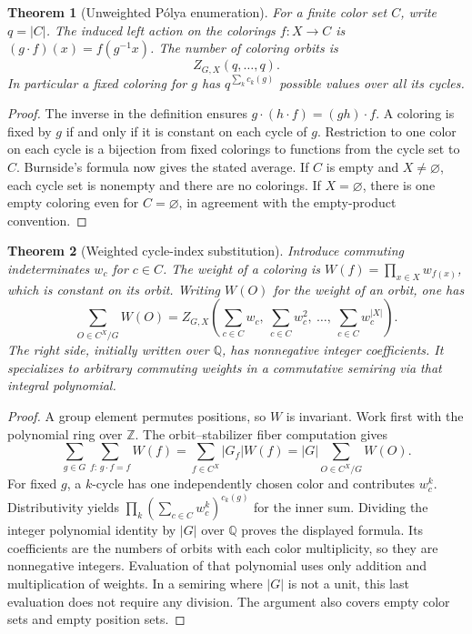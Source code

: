\documentclass[11pt,oneside,openany]{book}
\theoremstyle{plain}
\newtheorem{theorem}{Theorem}[chapter]
\theoremstyle{definition}
\theoremstyle{remark}
\begin{document}
\begin{theorem}[Unweighted Pólya enumeration]\label{p204:W32}
For a finite color set \(C\), write \(q=|C|\).
The induced left action on the colorings \(f:X\to C\) is
\((g\cdot f)(x)=f(g^{-1}x)\). The number of coloring orbits is
\[
 Z_{G,X}(q,\ldots,q).
\]
In particular a fixed coloring for \(g\) has
\(q^{\sum_k c_k(g)}\) possible values over all its cycles.
\end{theorem}
\begin{proof}
The inverse in the definition ensures
\(g\cdot(h\cdot f)=(gh)\cdot f\). A coloring is fixed by \(g\)
if and only if it is constant on each cycle of \(g\).
Restriction to one color on each cycle is a bijection from
fixed colorings to functions from the cycle set to \(C\).
Burnside's formula now gives the stated average. If \(C\) is
empty and \(X\ne\varnothing\), each cycle set is nonempty and
there are no colorings. If \(X=\varnothing\), there is one
empty coloring even for \(C=\varnothing\), in agreement with
the empty-product convention.
\end{proof}

\begin{theorem}[Weighted cycle-index substitution]\label{p204:W33}
Introduce commuting indeterminates \(w_c\) for \(c\in C\).
The weight of a coloring is
\(W(f)=\prod_{x\in X}w_{f(x)}\), which is constant on its orbit.
Writing \(W(O)\) for the weight of an orbit, one has
\[
 \sum_{O\in C^X/G}W(O)
 =Z_{G,X}\left(\sum_{c\in C}w_c,\ \sum_{c\in C}w_c^2,\
                         \ldots,\ \sum_{c\in C}w_c^{|X|}\right).
\]
The right side, initially written over \(\mathbb Q\), has
nonnegative integer coefficients. It specializes to arbitrary
commuting weights in a commutative semiring via that integral
polynomial.
\end{theorem}
\begin{proof}
A group element permutes positions, so \(W\) is invariant.
Work first with the polynomial ring over \(\mathbb Z\).
The orbit--stabilizer fiber computation gives
\[
 \sum_{g\in G}\sum_{f:\,g\cdot f=f} W(f)
  =\sum_{f\in C^X}|G_f| W(f)
  =|G|\sum_{O\in C^X/G} W(O).
\]
For fixed \(g\), a \(k\)-cycle has one independently chosen
color and contributes \(w_c^k\). Distributivity yields
\(\prod_k(\sum_{c\in C}w_c^k)^{c_k(g)}\) for the inner sum.
Dividing the integer polynomial identity by \(|G|\) over
\(\mathbb Q\) proves the displayed formula. Its coefficients
are the numbers of orbits with each color multiplicity, so
they are nonnegative integers. Evaluation of that polynomial
uses only addition and multiplication of weights. In a semiring
where \(|G|\) is not a unit, this last evaluation does not
require any division. The argument also covers empty color
sets and empty position sets.
\end{proof}
\end{document}
